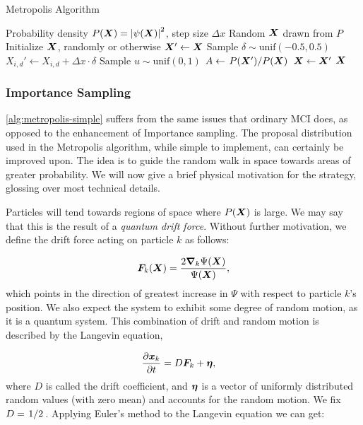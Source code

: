 \documentclass[Thesis.tex]{subfiles}
\begin{document}
\begin{algorithm}[h]
    \caption{Metropolis Algorithm}
    \label{alg:metropolis-simple}
    \begin{algorithmic}[1]
        \Require Probability density $P(\bm{X})=\abs{\psi(\bm{X})}^2$, step size $\Delta x$
        \Ensure Random $\bm{X}$ drawn from $P$
        \State Initialize $\bm{X}$, randomly or otherwise
        \Repeat
            \State $\bm{X}'\gets \bm{X}$
              \State Sample $\delta\sim \text{unif}(-0.5, 0.5)$
              \State $X_{i,d}'\gets X_{i,d} + \Delta x \cdot \delta$
            \EndFor
            \State Sample $u\sim\text{unif}(0, 1)$
            \State $A\gets \flatfrac{P\qty(\vX')}{P\qty(\vX)}$
              \State $\bm{X} \gets \bm{X}'$
            \EndIf
            \State \Yield $\bm{X}$
          \EndFor
    \end{algorithmic}
\end{algorithm}

\subsubsection{Importance Sampling}

\cref{alg:metropolis-simple} suffers from the same issues that ordinary MCI
does, as opposed to the enhancement of Importance sampling. The proposal
distribution used in the Metropolis algorithm, while simple to implement, can
certainly be improved upon. The idea is to guide the random walk in space
towards areas of greater probability. We will now give a brief physical
motivation for the strategy, glossing over most technical details.

Particles will tend towards regions of space where $P(\bm{X})$ is large. We may say
that this is the result of a \emph{quantum drift force}. Without further
motivation, we define the drift force acting on particle $k$ as follows:

\begin{align}
  \bm{F}_k(\bm{X}) = \frac{2\grad_k{\Psi(\bm{X})}}{\Psi(\bm{X})},
\end{align}
which points in the direction of greatest increase in $\Psi$ with respect to
particle $k$'s position. We also expect the
system to exhibit some degree of random motion, as it is a quantum system. This
combination of drift and random motion is described by the Langevin equation,

\begin{align}
 \pdv{\bm{x}_k}{t} &= D\bm{F}_k + \bm{\eta},
\end{align}
where $D$ is called the drift coefficient, and $\bm{\eta}$ is a vector of
uniformly distributed random values (with zero mean) and accounts for the random
motion. We fix $D=\flatfrac{1}{2}$. Applying Euler's method to the Langevin
equation we can get:
\end{document}

